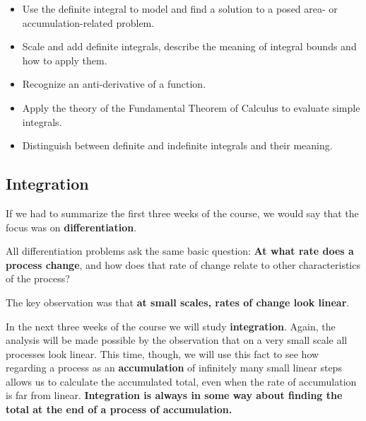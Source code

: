 



\setfont
\pagestyle{fancy}
\renewcommand{\Week}{4 }
\renewcommand{\WeekTitle}{\WeekTitleFour }

\fancyhead[LE,RO]{Week \Week}  %
\fancyfoot{}
\sectionbox{Week \#\Week: \WeekTitle}


\vspace{5mm}
\goals
\begin{itemize}
\item Use the definite integral to model and find a solution to a
  posed area- or accumulation-related problem.
\item Scale and add definite integrals, describe the meaning of
  integral bounds and how to apply them.
\item Recognize an anti-derivative of a function.
\item Apply the theory of the Fundamental Theorem of Calculus to
  evaluate simple integrals.
\item Distinguish between definite and indefinite integrals and their
  meaning.
\end{itemize}

\vspace{5mm}




\subsection*{Integration} 
If we had to summarize the first three weeks of the course, we would
say that the focus was on {\bf differentiation}.

All differentiation problems ask the same basic question: {\bf At what
  rate does a process change}, and how does that rate of change relate
to other characteristics of the process?

The key observation was that {\bf at small scales, rates of change look linear}.

\newpage

In the next three weeks of the course we will study {\bf integration}.
Again, the analysis will be made possible by the observation that on a
very small scale all processes look linear.  This time, though, we
will use this fact to see how regarding a process as an {\bf
  accumulation} of infinitely many small linear steps allows us to
calculate the accumulated total, even when the rate of accumulation is
far from linear.  {\bf Integration is always in some way about finding
  the total at the end of a process of accumulation.}


